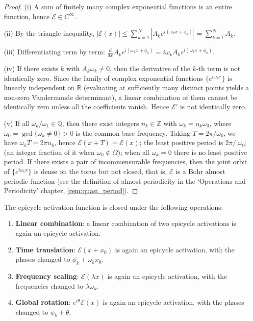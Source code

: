 \begin{proof}
(i) A sum of finitely many complex exponential functions is an entire function, hence $\mathcal E\in C^\infty$.

(ii) By the triangle inequality, $|\mathcal E(x)|\le\sum_{k=1}^{N}|A_k e^{i(\omega_k x+\phi_k)}|=\sum_{k=1}^{N}A_k$.

(iii) Differentiating term by term: $\frac{d}{dx}A_k e^{i(\omega_k x+\phi_k)}=i\omega_k A_k e^{i(\omega_k x+\phi_k)}$.

(iv) If there exists $k$ with $A_k\omega_k\neq 0$, then the derivative of the $k$-th term is not identically zero. Since the family of complex exponential functions $\{e^{i\omega_k x}\}$ is linearly independent on $\mathbb R$ (evaluating at sufficiently many distinct points yields a non-zero Vandermonde determinant), a linear combination of them cannot be identically zero unless all the coefficients vanish. Hence $\mathcal E'$ is not identically zero.

(v) If all $\omega_k/\omega_1\in\mathbb Q$, then there exist integers $n_k\in\mathbb Z$ with $\omega_k=n_k\omega_0$, where $\omega_0=\gcd\{\omega_k\ne0\}>0$ is the common base frequency. Taking $T=2\pi/\omega_0$, we have $\omega_k T=2\pi n_k$, hence $\mathcal E(x+T)=\mathcal E(x)$; the least positive period is $2\pi/\lvert\omega_0\rvert$ (an integer fraction of it when $\omega_0\notin\Omega$); when all $\omega_k=0$ there is no least positive period. If there exists a pair of incommensurable frequencies, then the joint orbit of $\{e^{i\omega_k x}\}$ is dense on the torus but not closed, that is, $\mathcal E$ is a Bohr almost periodic function (see the definition of almost periodicity in the `Operations and Periodicity' chapter, \cref{rem:quasi_period}).
\end{proof}

\begin{property}\label{prop:epicycle-closure}
The epicycle activation function is closed under the following operations:
\begin{enumerate}[label=(\roman*)]
    \item \textbf{Linear combination}: a linear combination of two epicycle activations is again an epicycle activation.
    \item \textbf{Time translation}: $\mathcal E(x+x_0)$ is again an epicycle activation, with the phases changed to $\phi_k+\omega_k x_0$.
    \item \textbf{Frequency scaling}: $\mathcal E(\lambda x)$ is again an epicycle activation, with the frequencies changed to $\lambda\omega_k$.
    \item \textbf{Global rotation}: $e^{i\theta}\mathcal E(x)$ is again an epicycle activation, with the phases changed to $\phi_k+\theta$.
\end{enumerate}
\end{property}

